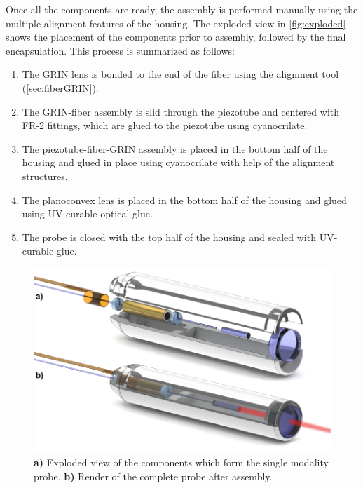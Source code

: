 %


Once all the components are ready, the assembly is performed manually using the multiple alignment features of the housing. The exploded view in \autoref{fig:exploded} shows the placement of the components prior to assembly, followed by the final encapsulation. This process is summarized as follows:

\begin{enumerate}
\item The GRIN lens is bonded to the end of the fiber using the alignment tool (\autoref{sec:fiberGRIN}).
\item The GRIN-fiber assembly is slid through the piezotube and centered with FR-2 fittings, which are glued to the piezotube using cyanocrilate.
\item The piezotube-fiber-GRIN assembly is placed in the bottom half of the housing and glued in place using cyanocrilate with help of the alignment structures.
\item The planoconvex lens is placed in the bottom half of the housing and glued using UV-curable optical glue.
\item The probe is closed with the top half of the housing and sealed with UV-curable glue.
\end{enumerate}

\begin{figure}[h!]\centering \includegraphics{figures/40_Fabrication/Assy/explodedRender/explodedRenderLaser.pdf}
      \caption{\textbf{a)} Exploded view of the components which form the single modality probe.
      \textbf{b)} Render of the complete probe after assembly.}
      \label{fig:exploded}
\end{figure}